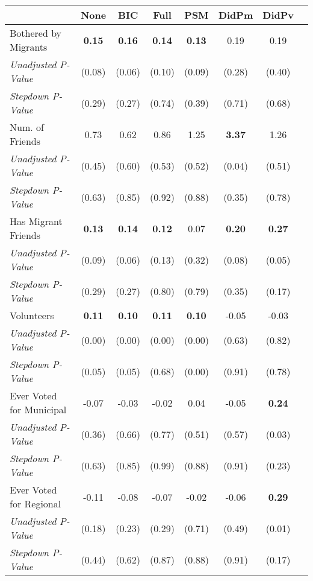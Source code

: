 \begin{tabular}{l c c c c c c c}
\toprule
 & None & BIC & Full & PSM & DidPm & DidPv \\
\midrule
Bothered by Migrants & \textbf{ 0.15 } & \textbf{ 0.16 } & \textbf{ 0.14 } & \textbf{ 0.13 } & 0.19 & 0.19 \\
\quad \textit{Unadjusted P-Value} & (0.08) & (0.06) & (0.10) & (0.09) & (0.28) & (0.40) \\
\quad \textit{Stepdown P-Value} & (0.29) & (0.27) & (0.74) & (0.39) & (0.71) & (0.68) \\
Num. of Friends & 0.73 & 0.62 & 0.86 & 1.25 & \textbf{ 3.37 } & 1.26 \\
\quad \textit{Unadjusted P-Value} & (0.45) & (0.60) & (0.53) & (0.52) & (0.04) & (0.51) \\
\quad \textit{Stepdown P-Value} & (0.63) & (0.85) & (0.92) & (0.88) & (0.35) & (0.78) \\
Has Migrant Friends & \textbf{ 0.13 } & \textbf{ 0.14 } & \textbf{ 0.12 } & 0.07 & \textbf{ 0.20 } & \textbf{ 0.27 } \\
\quad \textit{Unadjusted P-Value} & (0.09) & (0.06) & (0.13) & (0.32) & (0.08) & (0.05) \\
\quad \textit{Stepdown P-Value} & (0.29) & (0.27) & (0.80) & (0.79) & (0.35) & (0.17) \\
Volunteers & \textbf{ 0.11 } & \textbf{ 0.10 } & \textbf{ 0.11 } & \textbf{ 0.10 } & -0.05 & -0.03 \\
\quad \textit{Unadjusted P-Value} & (0.00) & (0.00) & (0.00) & (0.00) & (0.63) & (0.82) \\
\quad \textit{Stepdown P-Value} & (0.05) & (0.05) & (0.68) & (0.00) & (0.91) & (0.78) \\
Ever Voted for Municipal & -0.07 & -0.03 & -0.02 & 0.04 & -0.05 & \textbf{ 0.24 } \\
\quad \textit{Unadjusted P-Value} & (0.36) & (0.66) & (0.77) & (0.51) & (0.57) & (0.03) \\
\quad \textit{Stepdown P-Value} & (0.63) & (0.85) & (0.99) & (0.88) & (0.91) & (0.23) \\
Ever Voted for Regional & -0.11 & -0.08 & -0.07 & -0.02 & -0.06 & \textbf{ 0.29 } \\
\quad \textit{Unadjusted P-Value} & (0.18) & (0.23) & (0.29) & (0.71) & (0.49) & (0.01) \\
\quad \textit{Stepdown P-Value} & (0.44) & (0.62) & (0.87) & (0.88) & (0.91) & (0.17) \\
\bottomrule
\end{tabular}
